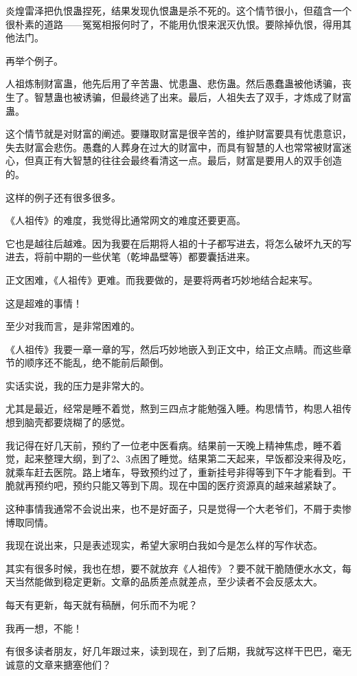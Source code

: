 \begin{this_body}
炎煌雷泽把仇恨蛊捏死，结果发现仇恨蛊是杀不死的。这个情节很小，但蕴含一个很朴素的道路——冤冤相报何时了，不能用仇恨来泯灭仇恨。要除掉仇恨，得用其他法门。

再举个例子。

人祖炼制财富蛊，他先后用了辛苦蛊、忧患蛊、悲伤蛊。然后愚蠢蛊被他诱骗，丧生了。智慧蛊也被诱骗，但最终逃了出来。最后，人祖失去了双手，才炼成了财富蛊。

这个情节就是对财富的阐述。要赚取财富是很辛苦的，维护财富要具有忧患意识，失去财富会悲伤。愚蠢的人葬身在过大的财富中，而具有智慧的人也常常被财富迷心，但真正有大智慧的往往会最终看清这一点。最后，财富是要用人的双手创造的。

这样的例子还有很多很多。

《人祖传》的难度，我觉得比通常网文的难度还要更高。

它也是越往后越难。因为我要在后期将人祖的十子都写进去，将怎么破坏九天的写进去，将前中期的一些伏笔（乾坤晶壁等）都要囊括进来。

正文困难，《人祖传》更难。而我要做的，是要将两者巧妙地结合起来写。

这是超难的事情！

至少对我而言，是非常困难的。

《人祖传》我要一章一章的写，然后巧妙地嵌入到正文中，给正文点睛。而这些章节的顺序还不能乱，绝不能前后颠倒。

实话实说，我的压力是非常大的。

尤其是最近，经常是睡不着觉，熬到三四点才能勉强入睡。构思情节，构思人祖传想到脑壳都要烧糊了的感觉。

我记得在好几天前，预约了一位老中医看病。结果前一天晚上精神焦虑，睡不着觉，起来整理大纲，到了2、3点困了睡觉。结果第二天起来，早饭都没来得及吃，就乘车赶去医院。路上堵车，导致预约过了，重新挂号非得等到下午才能看到。干脆就再预约吧，预约只能又等到下周。现在中国的医疗资源真的越来越紧缺了。

这种事情我通常不会说出来，也不是好面子，只是觉得一个大老爷们，不屑于卖惨博取同情。

我现在说出来，只是表述现实，希望大家明白我如今是怎么样的写作状态。

其实有很多时候，我也在想，要不就放弃《人祖传》？要不就干脆随便水水文，每天当然能做到稳定更新。文章的品质差点就差点，至少读者不会反感太大。

每天有更新，每天就有稿酬，何乐而不为呢？

我再一想，不能！

有很多读者朋友，好几年跟过来，读到现在，到了后期，我就写这样干巴巴，毫无诚意的文章来搪塞他们？


\end{this_body}
